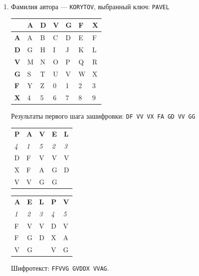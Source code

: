 \documentclass[a4paper, 14pt]{extarticle}
\begin{document}
\begin{enumerate}
    \item Фамилия автора --- \texttt{KORYTOV}, выбранный ключ: \texttt{PAVEL} 
    \begin{table}[h]
    \centering
    \begin{tabular}{@{}l|llllll@{}} %
     & \textbf{A} & \textbf{D} & \textbf{V} & \textbf{G} & \textbf{F} & \textbf{X} \\ \midrule
    \textbf{A} & A & B & C & D & E & F \\
    \textbf{D} & G & H & I & J & K & L \\
    \textbf{V} & M & N & O & P & Q & R \\
    \textbf{G} & S & T & U & V & W & X \\
    \textbf{F} & Y & Z & 0 & 1 & 2 & 3 \\
    \textbf{X} & 4 & 5 & 6 & 7 & 8 & 9
    \end{tabular}
    \end{table}

    Результаты первого шага зашифровки: \texttt{DF VV VX FA GD VV GG}

    \begin{table}[h]
    \centering
    \begin{tabular}{@{}lllll@{}}
    \textbf{P} & \textbf{A} & \textbf{V} & \textbf{E} & \textbf{L} \\
    \textit{4} & \textit{1} & \textit{5} & \textit{2} & \textit{3} \\ \midrule
    D & F & V & V & V \\
    X & F & A & G & D \\
    V & V & G & G & 
    \end{tabular}%
    \hspace{1cm}
    \begin{tabular}{@{}lllll@{}}
    \textbf{A} & \textbf{E} & \textbf{L} & \textbf{P} & \textbf{V} \\
    \textit{1} & \textit{2} & \textit{3} & \textit{4} & \textit{5} \\ \midrule
    F & V & V & D & V \\
    F & G & D & X & A \\
    V & G &  & V & G
    \end{tabular}
    \end{table}

    Шифротекст: \texttt{FFVVG GVDDX VVAG}.
    

\end{enumerate}
\end{document}
